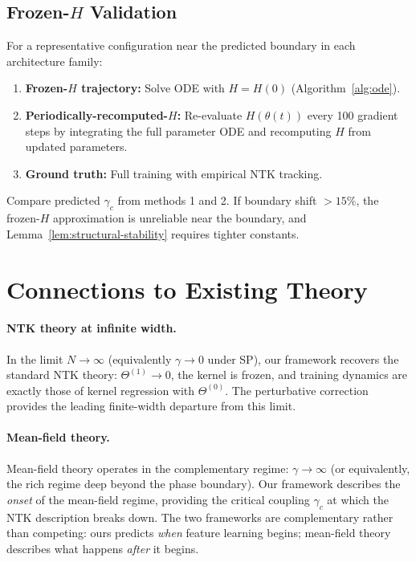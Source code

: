 \documentclass[11pt]{article}
\theoremstyle{definition}
\renewcommand{\Theta}{\varTheta}
\begin{document}
\subsection{Frozen-$H$ Validation}
\label{sec:frozen-H-validation}

For a representative configuration near the predicted boundary in each architecture family:

\begin{enumerate}[leftmargin=*]
\item \textbf{Frozen-$H$ trajectory:} Solve ODE with $H = H(0)$ (Algorithm~\ref{alg:ode}).
\item \textbf{Periodically-recomputed-$H$:} Re-evaluate $H(\theta(t))$ every 100 gradient steps by integrating the full parameter ODE and recomputing $H$ from updated parameters.
\item \textbf{Ground truth:} Full training with empirical NTK tracking.
\end{enumerate}

Compare predicted $\gamma_c$ from methods 1 and 2. If boundary shift $> 15\%$, the frozen-$H$ approximation is unreliable near the boundary, and Lemma~\ref{lem:structural-stability} requires tighter constants.

\section{Connections to Existing Theory}
\label{sec:connections}

\paragraph{NTK theory at infinite width.} In the limit $N \to \infty$ (equivalently $\gamma \to 0$ under SP), our framework recovers the standard NTK theory: $\Theta^{(1)} \to 0$, the kernel is frozen, and training dynamics are exactly those of kernel regression with $\Theta^{(0)}$. The perturbative correction provides the leading finite-width departure from this limit.

\paragraph{Mean-field theory.} Mean-field theory operates in the complementary regime: $\gamma \to \infty$ (or equivalently, the rich regime deep beyond the phase boundary). Our framework describes the \emph{onset} of the mean-field regime, providing the critical coupling $\gamma_c$ at which the NTK description breaks down. The two frameworks are complementary rather than competing: ours predicts \emph{when} feature learning begins; mean-field theory describes what happens \emph{after} it begins.
\end{document}
